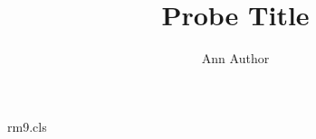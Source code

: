 \begin{filecontents*}[overwrite]{rm9.cls}
\newbox\kwbox
\newcommand*\keywords[1]{\gdef\@keywords{#1}}
\def\@keywords{}
\def\@maketitle{\begin{center}{\Large\@title\par}\@author\par\end{center}}\renewcommand\author[1]{\gdef\@author{#1\\ Keywords: \@keywords}}
\end{filecontents*}
\documentclass{rm9}
\title{Probe Title}\author{Ann Author}

\maketitle
\begin{center}Department of Probes\end{center}
\begin{abstract}
Late abstract words.
\end{abstract}
\section{Intro}
Intro text.

